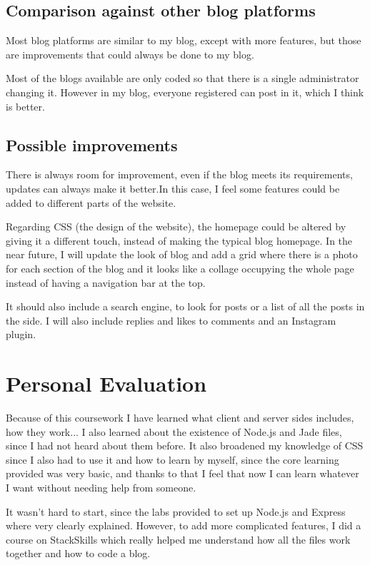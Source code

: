 \documentclass[10pt, a4paper]{article}
\begin{document}
    \subsection{Comparison against other blog platforms }
Most blog platforms are similar to my blog, except with more features, but those are improvements that could always be done to my blog.

Most of the blogs available are only coded so that there is a single administrator changing it. However in my blog, everyone registered can post in it, which I think is better.

    \subsection{Possible improvements}

There  is  always  room  for  improvement,  even  if  the  blog meets  its  requirements,  updates  can  always  make  it  better.In this case, I feel some features could be added to different parts of the website.

Regarding  CSS  (the  design  of  the  website),  the  homepage could be altered by giving it a different touch, instead of making  the  typical  blog  homepage. In the near future, I will update the look of blog and add a grid where there is a photo for each section of the blog and it looks like a collage occupying the whole page instead of having a navigation bar at the top.

It should also include a search engine, to look for posts or a list of all the posts in the side. I will also include replies and likes to comments and an Instagram plugin.



    \section{Personal Evaluation}

Because of this coursework I have learned what client and server sides includes, how they work... I also learned about the existence of Node.js and Jade files, since I had not heard about them before. It also broadened my knowledge of CSS since I also had to use it and how to learn by myself, since the core learning provided was very basic, and thanks to that I feel that now I can learn whatever I want without needing help from someone.

It wasn't hard to start, since the labs provided to set up Node.js and Express where very clearly explained. However, to add more complicated features, I did a course on StackSkills which really helped me understand how all the files work together and how to code a blog.
\end{document}
